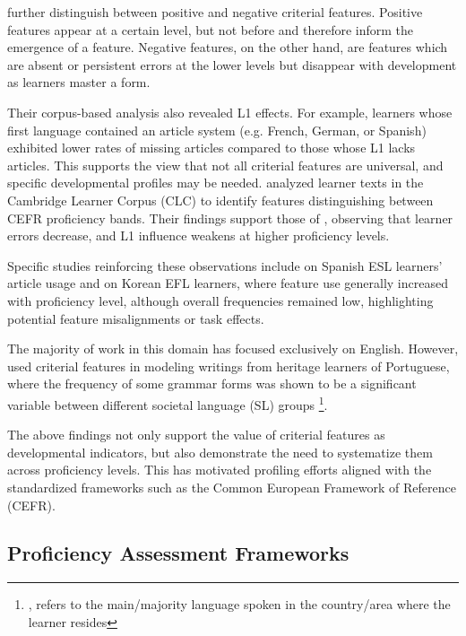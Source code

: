\citet{Hawkins_Buttery_2010} further distinguish between positive and negative criterial features.
Positive features appear at a certain level, but not before and therefore inform the emergence of a
feature.
Negative features, on the other hand, are features which are absent or persistent errors at the lower levels but
disappear with development as learners master a form.

Their corpus-based analysis also revealed L1 effects. For example, learners whose
first language contained an article system (e.g. French, German, or Spanish) exhibited lower rates of missing articles
compared to those whose L1 lacks articles. This supports the view that not all criterial features are universal, and
specific developmental profiles may be needed. \citet{salamoura2010} analyzed learner texts in the Cambridge Learner
Corpus (CLC) to identify features distinguishing between CEFR proficiency bands. Their findings support those of \citet{Hawkins_Buttery_2010,diez-bedmar2015,Kim2021}, observing that learner errors decrease, and L1 influence weakens at higher proficiency levels.

Specific studies reinforcing these observations include \citet{diez-bedmar2015} on Spanish ESL learners' article
usage and \citet{Kim2021} on Korean EFL learners, where feature use generally increased with proficiency level,
although overall frequencies remained low, highlighting potential feature misalignments or task effects.

The majority of work in this domain has focused exclusively on English. However, \citet{akef2025} used criterial
features in modeling writings from heritage learners of Portuguese, where the frequency of some grammar forms
was shown
to be a significant variable between different societal language (SL) groups \footnote{, refers to the main/majority language spoken in the country/area where
the learner resides}.

The above findings not only support the value of criterial features as developmental indicators, but also
demonstrate the need to systematize them across proficiency levels. This has motivated profiling efforts
\cite{Saville2010}
aligned
with
the standardized frameworks such as the Common European Framework of Reference (CEFR).



\subsection{Proficiency Assessment Frameworks}

